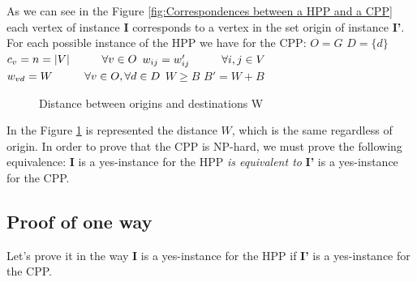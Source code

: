 \documentclass[12pt, a4paper,twoside]{memoir}
\newcommand{\newpar}{\vskip 0.2in \noindent}
\newcommand\tab[1][1cm]{\hspace*{#1}}
\begin{document}
	\noindent As we can see in the Figure \ref{fig:Correspondences between a HPP and a CPP} each vertex of instance \textbf{I} corresponds to a vertex in the set origin of instance  \textbf{I'}. \newline
	For each possible instance of the HPP we have for the CPP: \newline
	\tab $O=G$\newline
	\tab $D=\{d\}$\newline
	\tab $c_v=n=|V| \tab \forall v\in O$ \newline
	\tab $w_{ij}=w'_{ij} \tab \forall i,j\in V$\newline
	\tab $w_{vd}= W \tab \forall v\in O,\forall d\in D$\newline
	\tab $W\ge B$ \newline
	\tab $B'=W+B$
	
	\begin{figure}[H]
		\centering
		\caption{Distance between origins and destinations W}
		\label{fig:Distance between origins and destinations W}
	\end{figure}
	
	\noindent In the Figure \ref{fig:Distance between origins and destinations W} is represented the distance $W$, which is the same regardless of origin.
	\newpar
	In order to prove that the CPP is NP-hard, we must prove the following equivalence: \newline
	\textbf{I} is a yes-instance for the HPP \textit{is equivalent to} \textbf{I'} is a yes-instance for the CPP.
	
	\subsection{Proof of one way}
	\label{subsec:Proof of one way}
	
	Let's prove it in the way \textbf{I} is a yes-instance for the HPP if \textbf{I'} is a yes-instance for the CPP.
	
\end{document}
